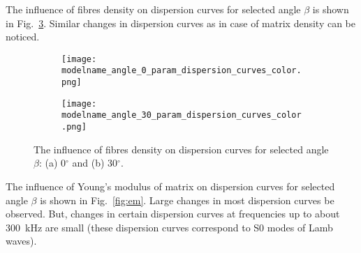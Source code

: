 \documentclass[preprint,12pt]{elsarticle}
\begin{document}
The influence of fibres density on dispersion curves for selected angle $\beta$ is shown in Fig.~\ref{fig:rhof}. Similar changes in dispersion curves as in case of matrix density can be noticed.

\begin{figure} [h!]
	\centering
	\newcommand{\modelname}{SASE3_plain_weave}
	\begin{subfigure}[b]{0.49\textwidth}
		\centering
		\texttt{[image: \\modelname\_angle\_0\_param\_dispersion\_curves\_color.png]}
		\caption{}
		\label{fig:rhof0}
	\end{subfigure}
	\hfill
	\begin{subfigure}[b]{0.49\textwidth}
		\centering
		\texttt{[image: \\modelname\_angle\_30\_param\_dispersion\_curves\_color.png]}
		\caption{}
		\label{fig:rhof30}
	\end{subfigure}
	\caption{The influence of fibres density on dispersion curves for selected angle $\beta$: (a) 0$^{\circ}$ and (b) 30$^{\circ}$.} 
	\label{fig:rhof}
\end{figure}

The influence of Young's modulus of matrix on dispersion curves for selected angle $\beta$ is shown in Fig.~\ref{fig:em}. Large changes in most dispersion curves be observed. But, changes in certain dispersion curves at frequencies up to about 300~kHz are small (these dispersion curves correspond to S0 modes of Lamb waves).
\end{document}
